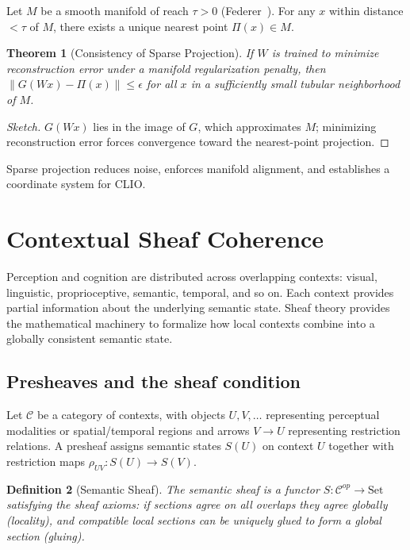 \documentclass[11pt,a4paper,twocolumn]{article}
\newtheorem{theorem}{Theorem}[section]
\newtheorem{definition}[theorem]{Definition}
\begin{document}
Let $M$ be a smooth manifold of reach $\tau > 0$
(Federer~\cite{federer-reach}). For any $x$ within distance $<\tau$ of
$M$, there exists a unique nearest point $\Pi(x) \in M$.

\begin{theorem}[Consistency of Sparse Projection]
If $W$ is trained to minimize reconstruction error under a manifold
regularization penalty, then $\|G(Wx) - \Pi(x)\| \le \epsilon$
for all $x$ in a sufficiently small tubular neighborhood of $M$.
\end{theorem}

\begin{proof}[Sketch]
$G(Wx)$ lies in the image of $G$, which approximates $M$; minimizing
reconstruction error forces convergence toward the nearest-point
projection.
\end{proof}

Sparse projection reduces noise, enforces manifold alignment, and
establishes a coordinate system for CLIO.


\section{Contextual Sheaf Coherence}

Perception and cognition are distributed across overlapping contexts:
visual, linguistic, proprioceptive, semantic, temporal, and so on. Each
context provides partial information about the underlying semantic
state. Sheaf theory provides the mathematical machinery to formalize how
local contexts combine into a globally consistent semantic state.

\subsection{Presheaves and the sheaf condition}

Let $\mathcal{C}$ be a category of contexts, with objects $U,V,\ldots$
representing perceptual modalities or spatial/temporal regions and
arrows $V \to U$ representing restriction relations. A presheaf assigns
semantic states $S(U)$ on context $U$ together with restriction maps
$\rho_{UV} : S(U) \to S(V)$.

\begin{definition}[Semantic Sheaf]
The semantic sheaf is a functor $S: \mathcal{C}^{op} \to \mathrm{Set}$
satisfying the sheaf axioms: if sections agree on all overlaps they
agree globally (locality), and compatible local sections can be
uniquely glued to form a global section (gluing).
\end{definition}
\end{document}

